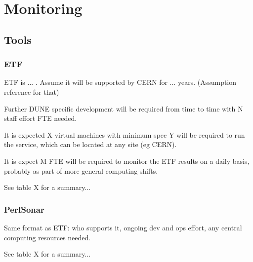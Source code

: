 \chapter{Monitoring }%
\label{ch:mon}

\FPadd\MonEtfTotalPeople\MonEtfOpsPeople\MonEtfDevPeople %

\section{Tools}
\label{sec:mon:xyz}  %
\subsection{ETF}

ETF is ... . Assume it will be supported by CERN for ... years. (Assumption reference for that)

Further DUNE specific development will be required from time to time
with N staff effort FTE needed.

It is expected X virtual machines with minimum spec Y will be required to run the service, which can be located at any site (eg CERN).

It is expect M FTE will be required to monitor the ETF results on a 
daily basis, probably as part of more general computing shifts.

See table X for a summary... 

\subsection{PerfSonar}

Same format as ETF: who supports it, ongoing dev and ops effort, any central computing resources needed.

See table X for a summary... 


